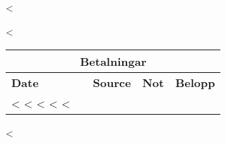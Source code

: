 \documentclass[10pt,letterpaper,oneside,onecolumn]{scrartcl}
\begin{document}
\vspace{0.3cm}

<%

\vspace{0.3cm}

<%
\begin{tabular}{@{}llllr@{}}
  \multicolumn{5}{c}{\textbf{Betalningar}} \\
  \hline
  \textbf{Date} & & \textbf{Source} & \textbf{Not} & \textbf{Belopp} \\
<%
<%
  <%
<%
<%
\end{tabular}
<%
\end{document}
